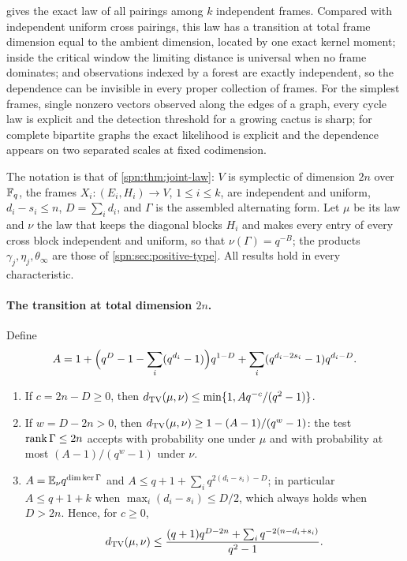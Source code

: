  gives the exact law of all pairings among $k$ independent frames. Compared
with independent uniform cross pairings, this law has a transition at total frame dimension equal to
the ambient dimension, located by one exact kernel moment; inside the critical window the limiting
distance is universal when no frame dominates; and observations indexed by a forest are exactly
independent, so the dependence can be invisible in every proper collection of frames. For the
simplest frames, single nonzero vectors observed along the edges of a graph, every cycle law is
explicit and the detection threshold for a growing cactus is sharp; for complete bipartite graphs the
exact likelihood is explicit and the dependence appears on two separated scales at fixed codimension.

The notation is that of \cref{spn:thm:joint-law}: $V$ is symplectic of dimension $2n$ over $\mathbb{F}_q$,
the frames $X_i\colon(E_i,H_i)\to V$, $1\le i\le k$, are independent and uniform, $d_i-s_i\le n$,
$D=\sum_id_i$, and $\Gamma$ is the assembled alternating form. Let $\mu$ be its law and $\nu$ the law
that keeps the diagonal blocks $H_i$ and makes every entry of every cross block independent and
uniform, so that $\nu(\Gamma)=q^{-B}$; the products $\gamma_j,\eta_j,\theta_\infty$ are those of
\cref{spn:sec:positive-type}. All results hold in every characteristic.

\paragraph{The transition at total dimension $2n$.}
Define
\begin{equation}\label{spn:eq:joint-A}
 A=1+\Bigl(q^D-1-\sum_i(q^{d_i}-1)\Bigr)q^{1-D}+\sum_i(q^{d_i-2s_i}-1)q^{d_i-D}.
\end{equation}

\begin{theorem}\label{spn:thm:joint-threshold}
\begin{enumerate}
\item If $c=2n-D\ge0$, then $d_{\mathrm{TV}}(\mu,\nu)\le\min\{1,Aq^{-c}/(q^2-1)\}$.
\item If $w=D-2n>0$, then $d_{\mathrm{TV}}(\mu,\nu)\ge1-(A-1)/(q^w-1)$: the test $\operatorname{rank}\Gamma\le2n$ accepts
with probability one under $\mu$ and with probability at most $(A-1)/(q^w-1)$ under $\nu$.
\item $A=\mathbb{E}_\nu q^{\dim\ker\Gamma}$ and $A\le q+1+\sum_iq^{2(d_i-s_i)-D}$; in particular
$A\le q+1+k$ when $\max_i(d_i-s_i)\le D/2$, which always holds when $D>2n$. Hence, for $c\ge0$,
\begin{equation}\label{spn:eq:joint-shape}
 d_{\mathrm{TV}}(\mu,\nu)\le\frac{(q+1)q^{D-2n}+\sum_iq^{-2(n-d_i+s_i)}}{q^2-1}.
\end{equation}
\end{enumerate}
\end{theorem}

